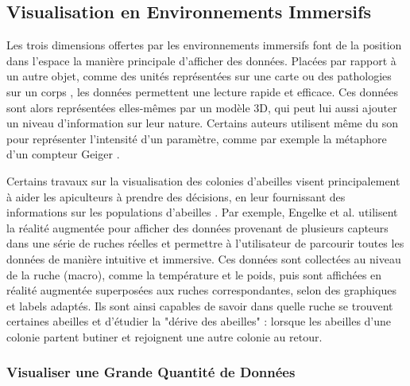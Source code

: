 	\subsection{Visualisation en Environnements Immersifs}
	
	Les trois dimensions offertes par les environnements immersifs font de la position dans l'espace la manière principale d'afficher des données. Placées par rapport à un autre objet, comme des unités représentées sur une carte \cite{durbin_battlefield_1998} ou des pathologies sur un corps \cite{coffey_interactive_2011}, les données permettent une lecture rapide et efficace. Ces données sont alors représentées elles-mêmes par un modèle 3D, qui peut lui aussi ajouter un niveau d'information sur leur nature. Certains auteurs utilisent même du son pour représenter l'intensité d'un paramètre, comme par exemple la métaphore d'un compteur Geiger \cite{frohlich_exploring_1999}.
	
	
		
		Certains travaux sur la visualisation des colonies d'abeilles visent principalement à aider les apiculteurs à prendre des décisions, en leur fournissant des informations sur les populations d'abeilles \cite{engelke_visual_2016, engelke_melissar_2016, nguyen_augmented_2017}. Par exemple, Engelke et al. \cite{engelke_visual_2016} utilisent la réalité augmentée pour afficher des données provenant de plusieurs capteurs dans une série de ruches réelles et permettre à l'utilisateur de parcourir toutes les données de manière intuitive et immersive. Ces données sont collectées au niveau de la ruche (macro), comme la température et le poids, puis sont affichées en réalité augmentée superposées aux ruches correspondantes, selon des graphiques et labels adaptés. Ils sont ainsi capables de savoir dans quelle ruche se trouvent certaines abeilles et d'étudier la "dérive des abeilles" : lorsque les abeilles d'une colonie partent butiner et rejoignent une autre colonie au retour.
	
	\subsubsection{Visualiser une Grande Quantité de Données}
	
